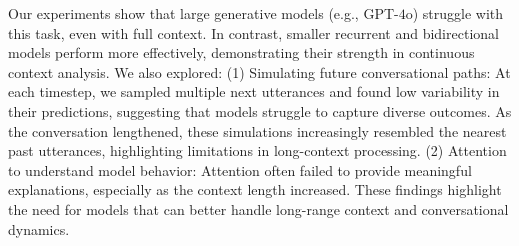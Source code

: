 Our experiments show that large generative models (e.g., GPT-$4$o) struggle with this task, even with full context.
%
In contrast, smaller recurrent and bidirectional models perform more effectively, demonstrating their strength in continuous context analysis.
%
We also explored:
%
(1) Simulating future conversational paths: At each timestep, we sampled multiple next utterances and found low variability in their predictions, suggesting that models struggle to capture diverse outcomes.
%
As the conversation lengthened, these simulations increasingly resembled the nearest past utterances, highlighting limitations in long-context processing.
%
(2) Attention to understand model behavior: Attention often failed to provide meaningful explanations, especially as the context length increased.
%
These findings highlight the need for models that can better handle long-range context and conversational dynamics.
%

